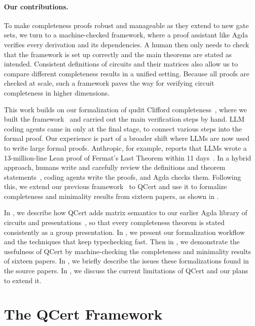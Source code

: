 \documentclass[acmsmall,nonacm,11pt,screen]{acmart}
\begin{document}
\paragraph{Our contributions.} To make completeness proofs robust and manageable as they extend to new gate sets, we turn to a machine-checked framework, where a proof assistant like Agda~\cite{norell2007thesis,bove2009agda} verifies every derivation and its dependencies. A human then only needs to check that the framework is set up correctly and the main theorems are stated as intended. Consistent definitions of circuits and their matrices also allow us to compare different completeness results in a unified setting. Because all proofs are checked at scale, such a framework paves the way for verifying circuit completeness in higher dimensions.

This work builds on our formalization of qudit Clifford completeness~\cite{bian2026qupit}, where we built the framework~\cite{bian2027popl} and carried out the main verification steps by hand. LLM coding agents came in only at the final stage, to connect various steps into the formal proof. Our experience is part of a broader shift where LLMs are now used to write large formal proofs. Anthropic, for example, reports that LLMs wrote a 13-million-line Lean proof of Fermat's Last Theorem within 11 days~\cite{anthropic2026flt}. In a hybrid approach, humans write and carefully review the definitions and theorem statements~\cite{hales2026reliability}, coding agents write the proofs, and Agda checks them. Following this, we extend our previous framework~\cite{bian2027popl} to QCert and use it to formalize completeness and minimality results from sixteen papers, as shown in .


 
In , we describe how QCert adds matrix semantics to our earlier Agda library of circuits and presentations~\cite{bian2027popl}, so that every completeness theorem is stated consistently as a group presentation. In , we present our formalization workflow and the techniques that keep typechecking fast. Then in , we demonstrate the usefulness of QCert by machine-checking the completeness and minimality results of sixteen papers. In , we briefly describe the issues these formalizations found in the source papers. In , we discuss the current limitations of QCert and our plans to extend it.

\section{The QCert Framework}
\label{sec:form}
\end{document}
